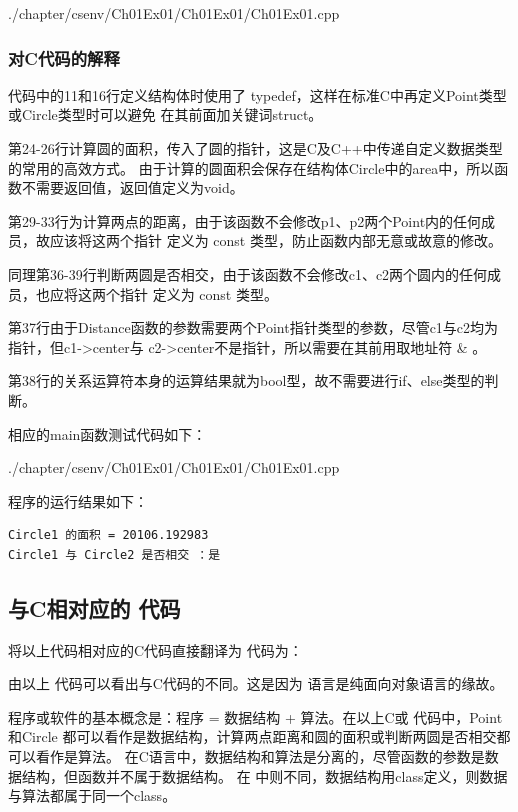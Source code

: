 
        {./chapter/csenv/Ch01Ex01/Ch01Ex01/Ch01Ex01.cpp}

\subsubsection{对C代码的解释}
代码中的11和16行定义结构体时使用了 typedef，这样在标准C中再定义Point类型或Circle类型时可以避免
在其前面加关键词struct。

第24-26行计算圆的面积，传入了圆的指针，这是C及C++中传递自定义数据类型的常用的高效方式。
由于计算的圆面积会保存在结构体Circle中的area中，所以函数不需要返回值，返回值定义为void。

第29-33行为计算两点的距离，由于该函数不会修改p1、p2两个Point内的任何成员，故应该将这两个指针
定义为 const 类型，防止函数内部无意或故意的修改。

同理第36-39行判断两圆是否相交，由于该函数不会修改c1、c2两个圆内的任何成员，也应将这两个指针
定义为 const 类型。

第37行由于Distance函数的参数需要两个Point指针类型的参数，尽管c1与c2均为指针，但c1->center与
c2->center不是指针，所以需要在其前用取地址符 \& 。

第38行的关系运算符本身的运算结果就为bool型，故不需要进行if、else类型的判断。

相应的main函数测试代码如下：


{./chapter/csenv/Ch01Ex01/Ch01Ex01/Ch01Ex01.cpp}

程序的运行结果如下：
\begin{verbatim}
Circle1 的面积 = 20106.192983
Circle1 与 Circle2 是否相交 ：是
\end{verbatim}


\subsection{与C相对应的 \cs 代码}

将以上代码相对应的C代码直接翻译为 \cs 代码为：



由以上 \cs 代码可以看出与C代码的不同。这是因为 \cs 语言是纯面向对象语言的缘故。

程序或软件的基本概念是：程序 = 数据结构 + 算法。在以上C或 \cs 代码中，Point和Circle
都可以看作是数据结构，计算两点距离和圆的面积或判断两圆是否相交都可以看作是算法。
在C语言中，数据结构和算法是分离的，尽管函数的参数是数据结构，但函数并不属于数据结构。
在 \cs 中则不同，数据结构用class定义，则数据与算法都属于同一个class。

